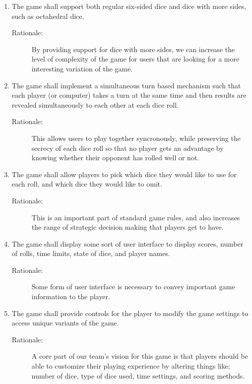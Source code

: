 \begin{enumerate}[label=R\arabic*, start=1, left=0pt]
    \item \label{R5} The game shall support both regular six-sided dice and dice with more sides, such as octahedral dice.
    \begin{description}
        \item[Rationale:] By providing support for dice with more sides, we can increase the level of complexity of the game for users that are looking for a more interesting variation of the game.
    \end{description}

    \item \label{R6} The game shall implement a simultaneous turn based mechanism such that each player (or computer) takes a turn at the same time and then results are revealed simultaneously to each other at each dice roll.
    \begin{description}
        \item[Rationale:] This allows users to play together syncronously, while preserving the secrecy of each dice roll so that no player gets an advantage by knowing whether their opponent has rolled well or not.
    \end{description}

    \item \label{R7} The game shall allow players to pick which dice they would like to use for each roll, and which dice they would like to omit.
    \begin{description}
        \item[Rationale:] This is an important part of standard game rules, and also increases the range of strategic decision making that players get to have.
    \end{description}

    \item \label{R8} The game shall display some sort of user interface to display scores, number of rolls, time limits, state of dice, and player names.
    \begin{description}
        \item[Rationale:] Some form of user interface is necessary to convey important game information to the player.
    \end{description}

    \item \label{R9} The game shall provide controls for the player to modify the game settings to access unique variants of the game.
    \begin{description}
        \item[Rationale:] A core part of our team's vision for this game is that players should be able to customize their playing experience by altering things like; number of dice, type of dice used, time settings, and scoring methods.
    \end{description}


\end{enumerate}
